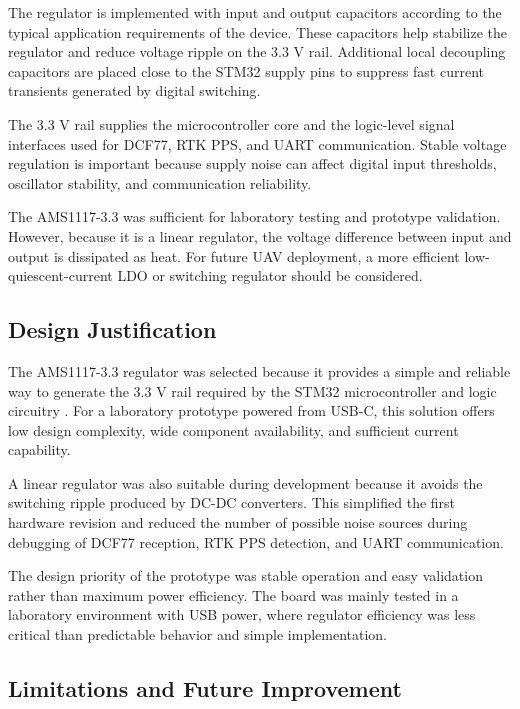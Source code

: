 The regulator is implemented with input and output capacitors according to the typical application requirements of the device. These capacitors help stabilize the regulator and reduce voltage ripple on the 3.3 V rail. Additional local decoupling capacitors are placed close to the STM32 supply pins to suppress fast current transients generated by digital switching.

The 3.3 V rail supplies the microcontroller core and the logic-level signal interfaces used for DCF77, RTK PPS, and UART communication. Stable voltage regulation is important because supply noise can affect digital input thresholds, oscillator stability, and communication reliability.

The AMS1117-3.3 was sufficient for laboratory testing and prototype validation. However, because it is a linear regulator, the voltage difference between input and output is dissipated as heat. For future UAV deployment, a more efficient low-quiescent-current LDO or switching regulator should be considered.

\subsection{Design Justification}

The AMS1117-3.3 regulator was selected because it provides a simple and reliable way to generate the 3.3 V rail required by the STM32 microcontroller and logic circuitry \cite{ams1117Datasheet}. For a laboratory prototype powered from USB-C, this solution offers low design complexity, wide component availability, and sufficient current capability.

A linear regulator was also suitable during development because it avoids the switching ripple produced by DC-DC converters. This simplified the first hardware revision and reduced the number of possible noise sources during debugging of DCF77 reception, RTK PPS detection, and UART communication.

The design priority of the prototype was stable operation and easy validation rather than maximum power efficiency. The board was mainly tested in a laboratory environment with USB power, where regulator efficiency was less critical than predictable behavior and simple implementation.

\subsection{Limitations and Future Improvement}

